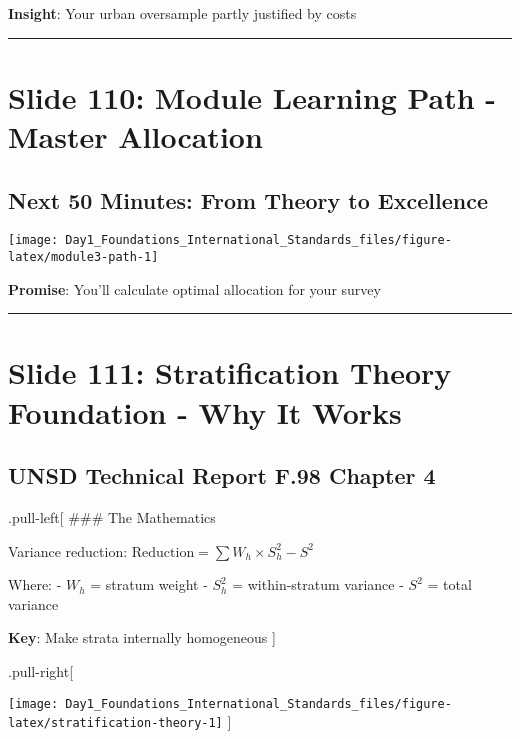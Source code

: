 \documentclass[
]{article}
\begin{document}
\textbf{Insight}: Your urban oversample partly justified by costs

\begin{center}\rule{0.5\linewidth}{0.5pt}\end{center}

\section{Slide 110: Module Learning Path - Master
Allocation}\label{slide-110-module-learning-path---master-allocation}

\subsection{Next 50 Minutes: From Theory to
Excellence}\label{next-50-minutes-from-theory-to-excellence}

\texttt{[image: Day1\_Foundations\_International\_Standards\_files/figure-latex/module3-path-1]}

\textbf{Promise}: You'll calculate optimal allocation for your survey

\begin{center}\rule{0.5\linewidth}{0.5pt}\end{center}

\section{Slide 111: Stratification Theory Foundation - Why It
Works}\label{slide-111-stratification-theory-foundation---why-it-works}

\subsection{UNSD Technical Report F.98 Chapter
4}\label{unsd-technical-report-f.98-chapter-4}

.pull-left{[} \#\#\# The Mathematics

Variance reduction: \(\text{Reduction} = \sum W_h \times S_h^2 - S^2\)

Where: - \(W_h\) = stratum weight - \(S_h^2\) = within-stratum variance
- \(S^2\) = total variance

\textbf{Key}: Make strata internally homogeneous {]}

.pull-right{[}

\texttt{[image: Day1\_Foundations\_International\_Standards\_files/figure-latex/stratification-theory-1]}
{]}
\end{document}
